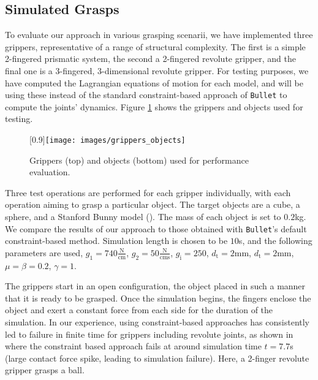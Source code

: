 \subsection{Simulated Grasps}\label{sec:grasp}
%
To evaluate our approach in various grasping scenarii, we have implemented three grippers, representative of a range of structural complexity. The first is a simple 2-fingered prismatic system, the second a 2-fingered revolute gripper, and the final one is a 3-fingered, 3-dimensional revolute gripper. For testing purposes, we have computed the Lagrangian equations of motion for each model, and will be using these instead of the standard constraint-based approach of \texttt{Bullet} to compute the joints' dynamics. Figure \ref{fig:grippersobjects} shows the grippers and objects used for testing.
%
\begin{figure}
	\centering
	\scalebox{1}[0.9]{\texttt{[image: images/grippers\_objects]}}
	\caption{Grippers (top) and objects (bottom) used for performance evaluation.}
	\label{fig:grippersobjects}
\end{figure}
%
Three test operations are performed for each gripper individually, with each operation aiming to grasp a particular object. The target objects are a cube, a sphere, and a Stanford Bunny model (\cite{levoy2005scanning}). The mass of each object is set to $0.2$kg. We compare the results of our approach to those obtained with \texttt{Bullet}'s default constraint-based method. Simulation length is chosen to be $10$s, and the following parameters are used, $g_1 = 740 \frac{\text{N}}{\text{cm}}$, $g_2 = 50 \frac{\text{N}}{\text{cms}}$, $g_\text{i} = 250$, $d_\text{t} = 2 \text{mm}$, $d_\text{t} = 2 \text{mm}$, $\mu = \beta = 0.2$, $\gamma = 1$.

The grippers start in an open configuration, the object placed in such a manner that it is ready to be grasped. Once the simulation begins, the fingers enclose the object and exert a constant force from each side for the duration of the simulation. In our experience, using constraint-based approaches has consistently led to failure in finite time for grippers including revolute joints, as shown in  where the constraint based approach fails at around simulation time $t=7.7$s (large contact force spike, leading to simulation failure). Here, a 2-finger revolute gripper grasps a ball.

